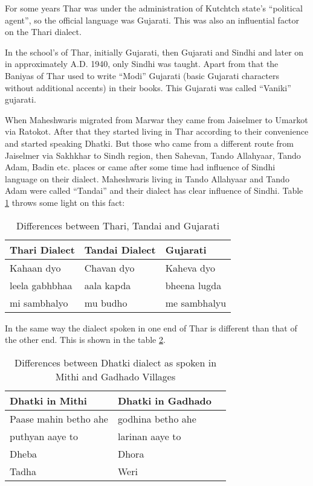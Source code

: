 For some years Thar was under the administration of Kutchtch state's ``political
agent'', so the official language was Gujarati. This was also an influential
factor on the Thari dialect.

In the school's of Thar, initially Gujarati, then Gujarati and Sindhi and later
on in approximately A.D. 1940, only Sindhi was taught. Apart from that the
Baniyas of Thar used to write ``Modi'' Gujarati (basic Gujarati characters
without additional accents) in their books. This Gujarati was called ``Vaniki''
gujarati.

When Maheshwaris migrated from Marwar they came from Jaiselmer to Umarkot via
Ratokot. After that they started living in Thar according to their convenience
and started speaking Dhatki. But those who came from a different route from
Jaiselmer via Sakhkhar to Sindh region, then Sahevan, Tando Allahyaar, Tando
Adam, Badin etc. places or came after some time had influence of Sindhi language
on their dialect. Maheshwaris living in Tando Allahyaar and Tando Adam were
called ``Tandai'' and their dialect has clear influence of Sindhi. Table
\ref{tbl:difftharitandaiguj} throws some light on this fact:
\begin{table}
\begin{center}
\begin{tabular}{lll}
\hline
\textbf{Thari Dialect} & \textbf{Tandai Dialect} & \textbf{Gujarati} \\
\hline
Kahaan dyo & Chavan dyo & Kaheva dyo \\ 
leela gabhbhaa & aala kapda & bheena lugda \\ 
mi sambhalyo & mu budho & me sambhalyu\\
\hline
\end{tabular}
\end{center}
\caption{Differences between Thari, Tandai and Gujarati}
\label{tbl:difftharitandaiguj}
\end{table}
In the same way the dialect spoken in one end of Thar is different than that of
the other end. This is shown in the table \ref{tbl:diffmithigad}.
\begin{table}
\begin{center}
\begin{tabular}{lll}
\hline
\textbf{Dhatki in Mithi} & \textbf{Dhatki in Gadhado} \\
\hline
Paase mahin betho ahe & godhina betho ahe \\
puthyan aaye to & larinan aaye to \\
Dheba & Dhora\\
Tadha & Weri\\
\hline
\end{tabular}
\end{center}
\caption{Differences between Dhatki dialect as spoken in Mithi and Gadhado Villages}
\label{tbl:diffmithigad}
\end{table}
